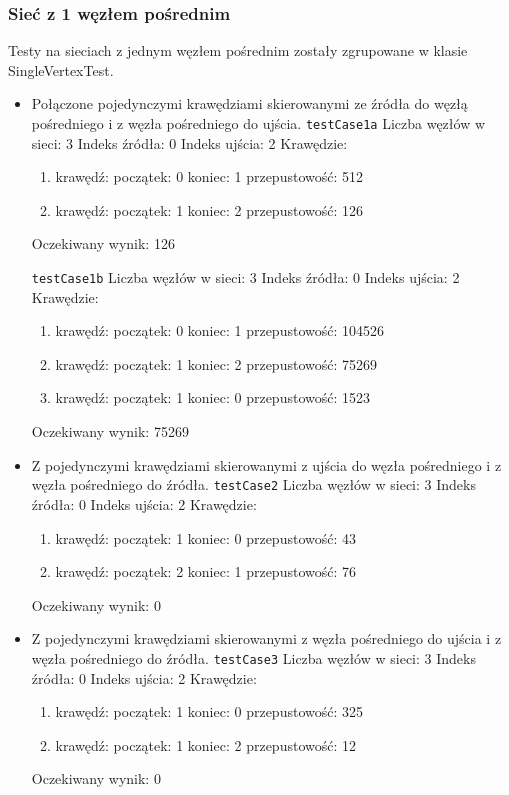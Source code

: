 \subsubsection{Sieć z 1 węzłem pośrednim}
Testy na sieciach z jednym węzłem pośrednim zostały zgrupowane
w klasie SingleVertexTest.
\begin{itemize}[nosep]
    \item Połączone pojedynczymi krawędziami skierowanymi ze źródła do węzłą
    pośredniego i z węzła pośredniego do ujścia.
    \texttt{testCase1a}
    Liczba węzłów w sieci: 3
    Indeks źródła: 0
    Indeks ujścia: 2
    Krawędzie:
    \begin{enumerate}[nosep]
        \item krawędź:
        początek: 0
        koniec: 1
        przepustowość: 512
        \item krawędź:
        początek: 1
        koniec: 2
        przepustowość: 126
    \end{enumerate}
    Oczekiwany wynik: 126

    \texttt{testCase1b}
    Liczba węzłów w sieci: 3
    Indeks źródła: 0
    Indeks ujścia: 2
    Krawędzie:
    \begin{enumerate}[nosep]
        \item krawędź:
        początek: 0
        koniec: 1
        przepustowość: 104526
        \item krawędź:
        początek: 1
        koniec: 2
        przepustowość: 75269
        \item krawędź:
        początek: 1
        koniec: 0
        przepustowość: 1523
    \end{enumerate}
    Oczekiwany wynik: 75269

    \item Z pojedynczymi krawędziami skierowanymi z ujścia do węzła pośredniego
    i z węzła pośredniego do źródła.
    \texttt{testCase2}
    Liczba węzłów w sieci: 3
    Indeks źródła: 0
    Indeks ujścia: 2
    Krawędzie:
    \begin{enumerate}[nosep]
        \item krawędź:
        początek: 1
        koniec: 0
        przepustowość: 43
        \item krawędź:
        początek: 2
        koniec: 1
        przepustowość: 76
    \end{enumerate}
    Oczekiwany wynik: 0

    \item Z pojedynczymi krawędziami skierowanymi z węzła pośredniego do ujścia
    i z węzła pośredniego do źródła.
    \texttt{testCase3}
    Liczba węzłów w sieci: 3
    Indeks źródła: 0
    Indeks ujścia: 2
    Krawędzie:
    \begin{enumerate}[nosep]
        \item krawędź:
        początek: 1
        koniec: 0
        przepustowość: 325
        \item krawędź:
        początek: 1
        koniec: 2
        przepustowość: 12
    \end{enumerate}
    Oczekiwany wynik: 0


\end{itemize}
